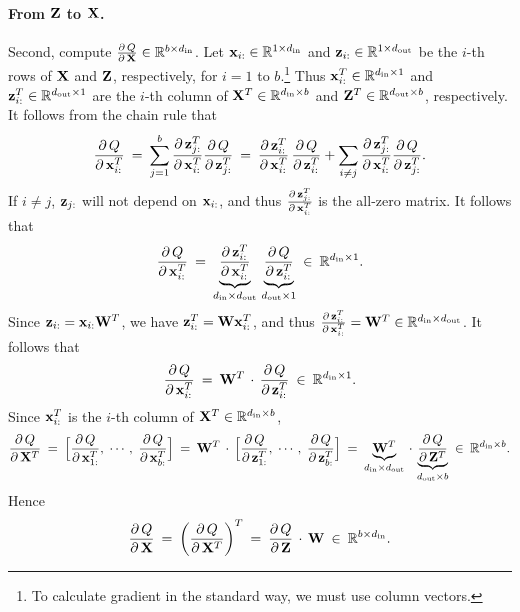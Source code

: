 \documentclass[11pt]{article}
\numberwithin{equation}{section}
\def\W{{\bf W}}
\def\X{{\bf X}}
\def\x{{\bf x}}
\def\Z{{\bf Z}}
\def\z{{\bf z}}
\def\RB{{\mathbb R}}
\def\din{{d_{\textrm{in}}}}
\def\dout{{d_{\textrm{out}}}}
\begin{document}
\paragraph{From $\Z$ to $\X$.}
Second, compute $\frac{\partial \, Q}{ \partial \, \X}  \in \RB^{b\times \din}$.
Let $\x_{i:} \in \RB^{1\times \din}$ and $\z_{i:} \in \RB^{1\times \dout}$ be the $i$-th rows of $\X$ and $\Z$, respectively, for $i = 1$ to $b$.\footnote{To calculate gradient in the standard way, we must use column vectors.}
Thus $\x_{i:}^T \in \RB^{\din \times 1}$ and $\z_{i:}^T \in \RB^{ \dout \times 1}$ are the $i$-th column of $\X^T \in \RB^{\din \times b}$ and $\Z^T \in \RB^{\dout \times b}$, respectively.
It follows from the chain rule that
\begin{equation*}
    \frac{ \partial \, Q }{ \partial \, \x_{i:}^T }
    \: = \: \sum_{j=1}^{b} \frac{ \partial \, \z_{j:}^T  }{ \partial \, \x_{i:}^T } \frac{ \partial \, Q }{ \partial \, \z_{j:}^T } 
    \: = \: \frac{ \partial \, \z_{i:}^T  }{ \partial \, \x_{i:}^T } \, \frac{ \partial \, Q }{ \partial \, \z_{i:}^T } 
    + \sum_{i\neq j} \frac{ \partial \, \z_{j:}^T  }{ \partial \, \x_{i:}^T } \frac{ \partial \, Q }{ \partial \, \z_{j:}^T } .
\end{equation*}
If $i \neq j$, $\z_{j:}$ will not depend on $\x_{i:}$, and thus $\frac{ \partial \, \z_{j:}^T  }{ \partial \, \x_{i:}^T } $ is the all-zero matrix.
It follows that
\begin{equation*}
    \frac{ \partial \, Q }{ \partial \, \x_{i:}^T }
    \: = \: \underbrace{\frac{ \partial \, \z_{i:}^T  }{ \partial \, \x_{i:}^T }}_{\din \times \dout} \, 
    \underbrace{\frac{ \partial \, Q }{ \partial \, \z_{i:}^T } }_{\dout\times 1}
    \: \in \: \RB^{\din \times 1}.
\end{equation*}
Since $\z_{i:} = \x_{i:} \W^T$, we have $\z_{i:}^T = \W \x_{i:}^T$, and thus $\frac{ \partial \, \z_{i:}^T }{ \partial \, \x_{i:}^T } = \W^T  \in  \RB^{\din \times \dout }$.
It follows that
\begin{equation*}
    \frac{ \partial \, Q }{ \partial \, \x_{i:}^T }
    \: = \: \W^T \, \cdot \, \frac{ \partial \, Q }{ \partial \, \z_{i:}^T } 
    \: \in \: \RB^{\din \times 1}.
\end{equation*}
Since $\x_{i:}^T$ is the $i$-th column of $\X^T \in \RB^{\din \times b}$,
\begin{equation*}
    \frac{ \partial \, Q }{ \partial \, \X^T }
    \: = \: \Big[ \frac{ \partial \, Q }{ \partial \, \x_{1:}^T } , \; \cdots , \; \frac{ \partial \, Q }{ \partial \, \x_{b:}^T } \Big]
    \: = \: \W^T \, \cdot \, \Big[ \frac{ \partial \, Q }{ \partial \, \z_{1:}^T } , \; \cdots , \; \frac{ \partial \, Q }{ \partial \, \z_{b:}^T } \Big]
    \: = \: \underbrace{\W^T}_{\din\times \dout} \, \cdot \,  
    \underbrace{\frac{ \partial \, Q }{ \partial \, \Z^T } }_{\dout \times b}
    \: \in \: \RB^{\din \times b}.
\end{equation*}
Hence
\begin{equation} \label{eq:grad_q_x}
    \frac{ \partial \, Q }{ \partial \, \X }
    \: = \: \bigg( \frac{ \partial \, Q }{ \partial \, \X^T } \bigg)^T
    \: = \: \frac{ \partial \, Q }{ \partial \, \Z } \, \cdot \, \W
    \: \in \: \RB^{b \times \din}.
\end{equation}
\end{document}
